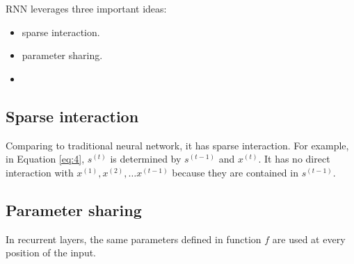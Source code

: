 RNN leverages three important ideas:
\begin{itemize}
\item sparse interaction.
\item parameter sharing.
\item 
\end{itemize}

\subsection{Sparse interaction}
\label{sec:sparse-interaction}


Comparing to traditional neural network, it has sparse interaction.
For example, in Equation \ref{eq:4}, \(s^{(t)}\) is determined by \(s^{(t-1)}\) and \(x^{(t)}\).
It has no direct interaction with \(x^{(1)}, x^{(2)}, \ldots x^{(t-1)}\) because they are contained in \(s^{(t-1)}\).


\subsection{Parameter sharing}
\label{sec:parameter-sharing}

In recurrent layers, the same parameters defined in function \(f\) are used at every position of the input.






